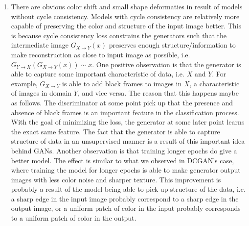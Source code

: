 \documentclass[11pt]{article}
\begin{document}
\begin{enumerate}
    \item There are obvious color shift and small shape deformaties in result of models without cycle consistency. Models with cycle consistency are relatively more capable of preserving the color and structure of the input image better. This is because cycle consistency loss constrains the generators such that the intermediate image $G_{X\rightarrow Y}(x)$ preserves enough structure/information to make reconstruction as close to input image as possible, i.e. $G_{Y\rightarrow X}(G_{X\rightarrow Y}(x)) \sim x$. One positive observation is that the generator is able to capture some important characteristic of data, i.e. $X$ and $Y$. For example, $G_{X\rightarrow Y}$ is able to add black frames to images in $X$, a characteristic of images in domain $Y$, and vice versa. The reason that this happens maybe as follows. The discriminator at some point pick up that the presence and absence of black frames is an important feature in the classification process. With the goal of minimizing the loss, the generator at some later point learns the exact same feature. The fact that the generator is able to capture structure of data in an unsupervised manner is a result of this important idea behind GANs. Another observation is that training longer epochs do give a better model. The effect is similar to what we observed in DCGAN's case, where training the model for longer epochs is able to make generator output images with less color noise and sharper texture. This improvement is probably a result of the model being able to pick up structure of the data, i.e. a sharp edge in the input image probably correspond to a sharp edge in the output image, or a uniform patch of color in the input probably corresponds to a uniform patch of color in the output.
\end{enumerate}
 

  
 
\end{document}
